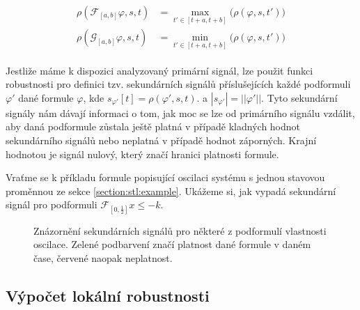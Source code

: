 \begin{align}\label{eq:stl:semantics}
\begin{array}{ll}
\rho(\mathcal{F}_{[a, b]}\varphi, s, t)		&= {\displaystyle \max_{t' \in [t + a, t + b]}} \Big(\rho(\varphi, s, t')\Big)		\\
\rho(\mathcal{G}_{[a, b]}\varphi, s, t)		&= {\displaystyle \min_{t' \in [t + a, t + b]}} \Big(\rho(\varphi, s, t')\Big)		
\end{array}
\end{align}

Jestliže máme k dispozici analyzovaný primární signál, lze použit funkci robustnosti pro definici tzv. sekundárních
signálů příslušejících každé podformuli $\varphi'$ dané formule $\varphi$, kde $s_{\varphi'}[t] = \rho(\varphi', s, t)$.
a $|s_{\varphi'}| = ||\varphi'||$. Tyto se\-kun\-dár\-ní signály nám dávají informaci o tom, jak moc se lze od primárního
signálu vzdálit, aby daná podformule zůstala ještě platná v případě klad\-ných hodnot sekundárního signálů
nebo neplatná v případě hodnot zá\-por\-ných. Krajní hodnotou je signál nulový, který značí hranici platnosti formule.


Vraťme se k příkladu formule popisující oscilaci systému s jednou stavovou proměnnou ze 
sekce \ref{section:stl:example}. Ukážeme si, jak vypadá sekundární signál pro podformuli
$\mathcal{F}_{[0, \frac{1}{2}]}x \leq -k$.

\begin{figure}[h!]
\begin{center}
\caption{Znázornění sekundárních signálů pro některé z podformulí vlastnosti oscilace. Zelené podbarvení
značí platnost dané formule v daném čase, červené naopak neplatnost.}
\end{center}
\end{figure}

\subsection{Výpočet lokální robustnosti}

